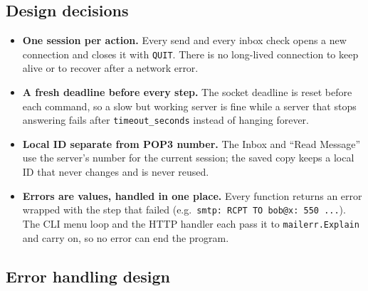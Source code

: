 \documentclass[11pt,a4paper]{article}
\begin{document}
\subsection{Design decisions}

\begin{itemize}
  \item \textbf{One session per action.} Every send and every inbox check opens a new
        connection and closes it with \texttt{QUIT}. There is no long-lived connection to
        keep alive or to recover after a network error.
  \item \textbf{A fresh deadline before every step.} The socket deadline is reset before each
        command, so a slow but working server is fine while a server that stops answering
        fails after \texttt{timeout\_seconds} instead of hanging forever.
  \item \textbf{Local ID separate from POP3 number.} The Inbox and ``Read Message'' use the
        server's number for the current session; the saved copy keeps a local ID that never
        changes and is never reused.
  \item \textbf{Errors are values, handled in one place.} Every function returns an error
        wrapped with the step that failed (e.g.\ \texttt{smtp: RCPT TO bob@x: 550 ...}). The
        CLI menu loop and the HTTP handler each pass it to \texttt{mailerr.Explain} and carry
        on, so no error can end the program.
\end{itemize}

\subsection{Error handling design}
\end{document}
